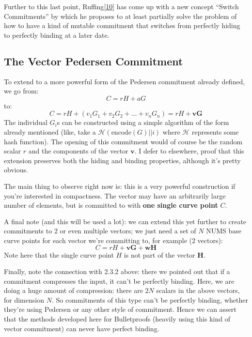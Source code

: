 \documentclass[10pt,a4paper]{article}
\begin{document}
Further to this last point,
Ruffing{[}\protect\hyperlink{anchor-21}{10}{]} has come up with a new
concept ``Switch Commitments'' by which he proposes to at least
partially solve the problem of how to have a kind of mutable commitment
that switches from perfectly hiding to perfectly binding at a later
date.

\hypertarget{the-vector-pedersen-commitment}{%
\subsection[The Vector Pedersen
Commitment]{\texorpdfstring{\protect\hypertarget{anchor-22}{}{}The
Vector Pedersen
Commitment}{The Vector Pedersen Commitment}}\label{the-vector-pedersen-commitment}}

To extend to a more powerful form of the Pedersen commitment already
defined, we go from:
\[C=rH + aG\]
to:
\[C=rH + (v_1G_1 + v_2G_2 + \ldots + v_nG_n) = rH + \textbf{vG}\]
The individual $G_i$s can be constructed using a simple algorithm of the form
already mentioned (like, take a $\mathcal{H}(\textrm{encode}(G)||i)$  where $\mathcal{H}$ represents some hash function).
The opening of this commitment would of course be the random scalar $r$ and
the components of the vector $\textbf{v}$. I defer to elsewhere, proof
that this extension preserves both the hiding and binding properties,
although it's pretty obvious.

The main thing to observe right now is: this is a very powerful
construction if you're interested in compactness. The vector may have an
arbitrarily large number of elements, but is committed to with
\textbf{one single curve point} $C$.

A final note (and this will be used a lot): we can extend this yet
further to create commitments to 2 or even multiple vectors; we just
need a set of $N$ NUMS base curve points for each vector we're committing
to, for example (2 vectors):
\[C = rH + \textbf{vG} + \textbf{wH}\]
Note here that the single curve point $H$ is not part of the vector $\textbf{H}$.

Finally, note the connection with 2.3.2 above: there we pointed out that
if a commitment compresses the input, it can't be perfectly binding.
Here, we are doing a huge amount of compression: there are $2N$ scalars in
the above vectors, for dimension $N$. So commitments of this type can't be
perfectly binding, whether they're using Pedersen or any other style of
commitment. Hence we can assert that the methods developed here for
Bulletproofs (heavily using this kind of vector commitment) can never
have perfect binding.
\end{document}
